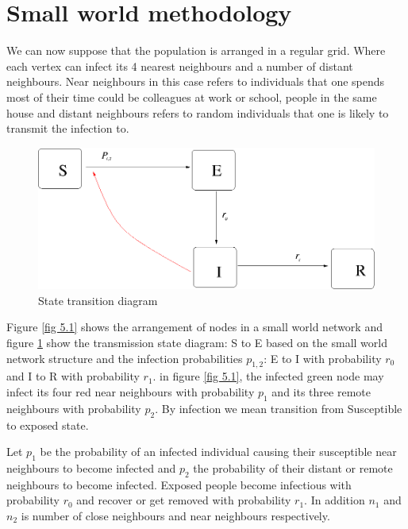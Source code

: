 \section{Small world methodology}

We  can now suppose that the population is arranged in a regular grid. Where each vertex can infect its 4 nearest neighbours and a number of distant neighbours. Near neighbours in this case refers to individuals that one spends most of their time could be colleagues at work or school, people in the same house and distant neighbours refers to random individuals that one is likely to transmit the infection to. 
 
 \begin{figure}[h]
 \centering
 \includegraphics[scale=0.3]{images/swseir.png}
 \caption{State transition diagram} \label{fig 5.2}
 \end{figure}
 
 
 
Figure \ref{fig 5.1} shows the arrangement of nodes in a small world network and figure \ref{fig 5.2} show the transmission state diagram: S to E based on the small world network structure and the infection probabilities $p_ {1,2} $: E to I with probability $r_0$ and I to R with probability $r_1$. in figure \ref{fig 5.1}, the infected green node may infect its four red near neighbours with probability $p_1$ and its three remote neighbours with probability $p_2$. By infection we mean transition from Susceptible to exposed state.

Let $p_1$ be the probability of an infected individual causing their susceptible near neighbours to become infected and $p_2$ the probability of their distant or remote neighbours to become infected. Exposed people become infectious with probability $r_0$ and recover or get removed with probability $r_1$. In addition $n_1$ and $n_2$ is number of close neighbours and near neighbours respectively.

